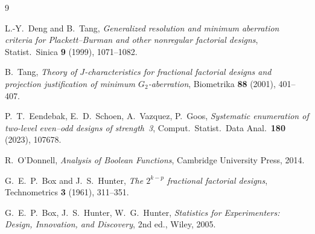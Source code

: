 \documentclass[11pt]{article}
\theoremstyle{definition}
\begin{document}
\begin{thebibliography}{9}

L.-Y.~Deng and B.~Tang,
\emph{Generalized resolution and minimum aberration criteria for
Plackett--Burman and other nonregular factorial designs},
Statist.\ Sinica \textbf{9} (1999), 1071--1082.

B.~Tang,
\emph{Theory of $J$-characteristics for fractional factorial designs and
projection justification of minimum $G_2$-aberration},
Biometrika \textbf{88} (2001), 401--407.

P.~T.~Eendebak, E.~D.~Schoen, A.~Vazquez, P.~Goos,
\emph{Systematic enumeration of two-level even--odd designs of strength~3},
Comput.\ Statist.\ Data Anal.\ \textbf{180} (2023), 107678.

R.~O'Donnell,
\emph{Analysis of Boolean Functions},
Cambridge University Press, 2014.

G.~E.~P.~Box and J.~S.~Hunter,
\emph{The $2^{k-p}$ fractional factorial designs},
Technometrics \textbf{3} (1961), 311--351.

G.~E.~P.~Box, J.~S.~Hunter, W.~G.~Hunter,
\emph{Statistics for Experimenters: Design, Innovation, and Discovery},
2nd ed., Wiley, 2005.

\end{thebibliography}
\end{document}

